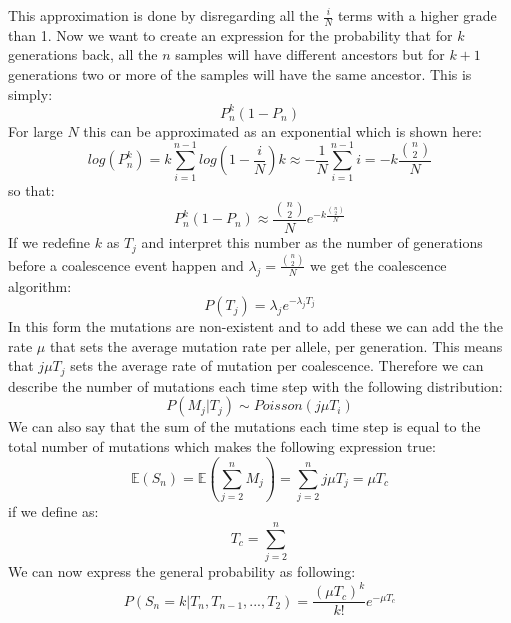 \documentclass[15pt]{article}
\begin{document}
This approximation is done by disregarding all the $\frac{i}{N}$ terms with a higher grade than 1.
Now we want to create an expression for the probability that for $k$ generations back, all the $n$ samples will have different ancestors but for $k+1$ generations two or more of the samples will have the same ancestor. This is simply:
\[ P_n^k(1-P_n)\]
For large $N$ this can be approximated as an exponential which is shown here:
\begin{equation}
	log(P^k_n) = k\sum_{i=1}^{n-1} log(1-\frac{i}{N}) k\approx -\frac{1}{N}\sum_ {i=1}^{n-1}i = -k\frac{\binom{n}{2}}{N}
\end{equation}
so that:
\begin{equation}
	P_n^k(1-P_n) \approx \frac{\binom{n}{2}}{N}e^{-k\frac{\binom{n}{2}}{N}}
\end{equation}
If we redefine $k$ as $T_j$ and interpret this number as the number of generations before a coalescence event happen and $\lambda_j = \frac{\binom{n}{2}}{N}$ we get the coalescence algorithm:
\begin{equation}
	P(T_j)= \lambda_j e ^ {-\lambda_j T_j}
\end{equation}
In this form the mutations are non-existent and to add these we can add the the rate $\mu$ that sets the average mutation rate per allele, per generation. This means that $j\mu T_j$ sets the average rate of mutation per coalescence. Therefore we can describe the number of mutations each time step with the following distribution:
\begin{equation}
	P(M_j|T_j) \sim Poisson(j \mu T_i)
\end{equation}
We can also say that the sum of the mutations each time step is equal to the total number of mutations which makes the following expression true:
\begin{equation}
	\mathbb{E}(S_n) = \mathbb{E}(\sum_{j=2}^n M_j) = \sum_{j=2}^n j\mu T_j = \mu T_c
\end{equation}
if we define as:
\begin{equation}
	T_c = \sum_{j = 2}^n
	\label{eq:T_c}
\end{equation}
We can now express the general probability as following:
\begin{equation}
	P(S_n = k |T_n, T_{n-1},..., T_2) = \frac{(\mu T_c)^k}{k!}e^{-\mu T_c}
	\label{eq:general equation}
\end{equation}
\end{document}

